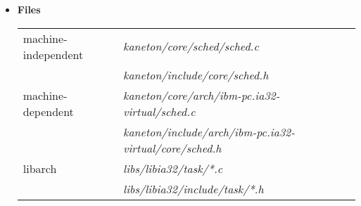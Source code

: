 \begin{itemize}
	 {
	   This function permits the current thread to relinquish
	   the processor voluntarily.

	   Don't care about the argument .
	 }

	 {
	   This function adds a runnable thread to the scheduler. Even
	   if the added thread has the highest priority, do not yield
	   the current thread.
	 }

	 {
	   This function remove a thread from the
	   scheduler. \textbf{Be careful:} the thread to remove can be
	   the currently executing thread.
	 }

	 {
	   This function asks the scheduler to update the thread
	    in its internal data structures since
	   for example the thread's priority just changed.
	 }

	 {
	   This function returns in  the identifier
	   of the thread currently executed.
	 }

	 {
	   This function just elects and schedules a new thread.

	   \textbf{Note}: the machine-dependent code of this function
	   takes an additional parameter.

		    {
		      The argument  is the new
		      thread to run.
		    }
	 }

	 {
	   This function initializes the scheduler.
	 }

	 {
	   This function cleans the scheduler.
	 }

  \item {\bf Files}\\

    \begin{tabular}{| l | l |}
      \hline
      machine-independent & {\em kaneton/core/sched/sched.c}\\
      &  {\em kaneton/include/core/sched.h}\\\hline
      machine-dependent & {\em kaneton/core/arch/ibm-pc.ia32-virtual/sched.c}\\
      & {\em kaneton/include/arch/ibm-pc.ia32-virtual/core/sched.h}\\\hline
      libarch & {\em libs/libia32/task/*.c}\\
      &  {\em libs/libia32/include/task/*.h}\\\hline
    \end{tabular}

\end{itemize}

